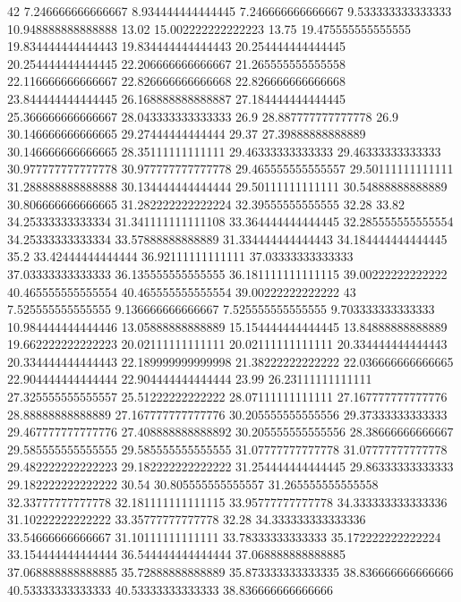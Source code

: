 42 7.246666666666667 8.934444444444445 7.246666666666667 9.533333333333333 10.948888888888888 13.02 15.002222222222223 13.75 19.475555555555555 19.834444444444443 19.834444444444443 20.254444444444445 20.254444444444445 22.206666666666667 21.265555555555558 22.116666666666667 22.826666666666668 22.826666666666668 23.844444444444445 26.168888888888887 27.184444444444445 25.366666666666667 28.043333333333333 26.9 28.887777777777778 26.9 30.146666666666665 29.27444444444444 29.37 27.39888888888889 30.146666666666665 28.35111111111111 29.46333333333333 29.46333333333333 30.977777777777778 30.977777777777778 29.465555555555557 29.50111111111111 31.288888888888888 30.134444444444444 29.50111111111111 30.54888888888889 30.806666666666665 31.282222222222224 32.39555555555555 32.28 33.82 34.25333333333334 31.341111111111108 33.364444444444445 32.285555555555554 34.25333333333334 33.57888888888889 31.334444444444443 34.184444444444445 35.2 33.42444444444444 36.92111111111111 37.03333333333333 37.03333333333333 36.135555555555555 36.181111111111115 39.00222222222222 40.465555555555554 40.465555555555554 39.00222222222222
43 7.525555555555555 9.136666666666667 7.525555555555555 9.703333333333333 10.984444444444446 13.05888888888889 15.154444444444445 13.84888888888889 19.662222222222223 20.02111111111111 20.02111111111111 20.334444444444443 20.334444444444443 22.189999999999998 21.38222222222222 22.036666666666665 22.904444444444444 22.904444444444444 23.99 26.23111111111111 27.325555555555557 25.51222222222222 28.07111111111111 27.167777777777776 28.88888888888889 27.167777777777776 30.205555555555556 29.37333333333333 29.467777777777776 27.408888888888892 30.205555555555556 28.38666666666667 29.585555555555555 29.585555555555555 31.07777777777778 31.07777777777778 29.482222222222223 29.182222222222222 31.254444444444445 29.86333333333333 29.182222222222222 30.54 30.805555555555557 31.265555555555558 32.33777777777778 32.181111111111115 33.95777777777778 34.333333333333336 31.10222222222222 33.35777777777778 32.28 34.333333333333336 33.54666666666667 31.10111111111111 33.78333333333333 35.172222222222224 33.154444444444444 36.544444444444444 37.068888888888885 37.068888888888885 35.72888888888889 35.873333333333335 38.836666666666666 40.53333333333333 40.53333333333333 38.836666666666666
